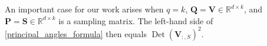 \documentclass[twoside,11pt]{book}
\newtheorem{example}{Example}
\numberwithin{theorem}{chapter}
\numberwithin{definition}{chapter}
\numberwithin{proposition}{chapter}
\numberwithin{corollary}{chapter}
\numberwithin{example}{chapter}
\numberwithin{lemma}{chapter}
\DeclareMathOperator{\Det}{Det}
\DeclareMathOperator{\Vol}{Vol}
\DeclareMathOperator{\Tran}{\intercal}
\newcommand{\ab}[1]{\textcolor{red}{#1}}
\begin{document}
An important case for our work arises when $q=k$, $\bm{Q}=\bm{V} \in \mathbb{R}^{d \times k}$, and $\bm{P}=\bm{S}\in \mathbb{R}^{d \times k}$ is a sampling matrix. The left-hand side of \eqref{principal_angles_formula} then equals $\Det(\bm{V}_{:,S})^2$.



%    
\end{document}
